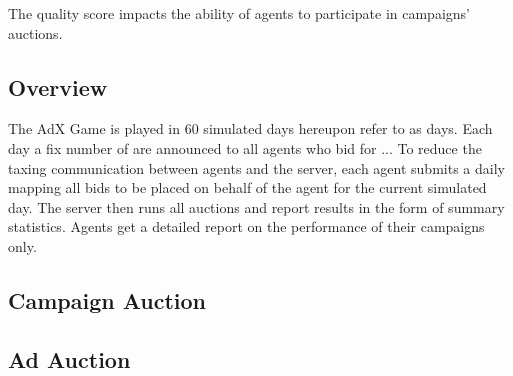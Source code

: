 The quality score impacts the ability of agents to participate in campaigns' auctions.

\subsection{Overview}
The AdX Game is played in 60 simulated days hereupon refer to as days. 
Each day a fix number of  are announced to all agents
who bid for ...
To reduce the taxing communication between agents and the server, each agent
submits a daily  mapping all bids to be placed on behalf of the agent
for the current simulated day. The server then runs all auctions and report 
results in the form of summary statistics. Agents get a detailed report on the performance
of their campaigns only.

\subsection{Campaign Auction}

\subsection{Ad Auction}
  



